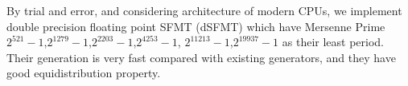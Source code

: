 \documentclass{svmult}
\def\bbf2{\ifmmode \mathbb{F}_2 \else $\mathbb{F}_2$ \fi}
\begin{document}
By trial and error, and considering architecture of modern CPUs, we
implement double precision floating point SFMT (dSFMT) which have
Mersenne Prime $2^{521}-1$,$2^{1279}-1$,$2^{2203}-1$,$2^{4253}-1$,
$2^{11213}-1$,$2^{19937}-1$ as their least period.
Their generation is very fast compared with existing generators,
and they have good equidistribution property.


\end{document}
